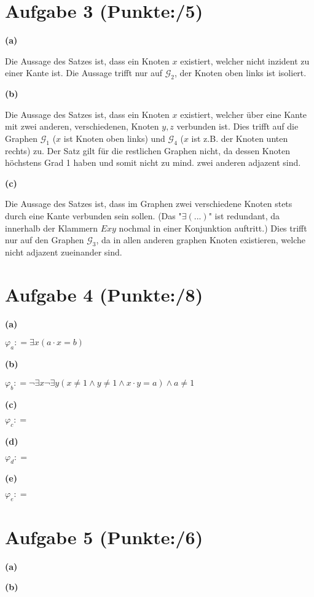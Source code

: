 \documentclass[11pt, a4paper]{article}
\newcommand{\pp}{5}
\newcommand{\ppp}{8}
\newcommand{\pppp}{6}
\newcommand{\defgr}{\mathrel{\mathop:\!\!=}}
\begin{document}
\section*{Aufgabe 3 (Punkte:\qquad/\pp)}
\textbf{(a)}
\begin{adjustwidth}{20pt}{20pt}
	Die Aussage des Satzes ist, dass ein Knoten $x$ existiert, welcher nicht inzident zu einer Kante ist. Die Aussage trifft nur auf $\mathcal{G}_2$, der Knoten oben links ist isoliert.
\end{adjustwidth}
\textbf{(b)}
\begin{adjustwidth}{20pt}{20pt}
	Die Aussage des Satzes ist, dass ein Knoten $x$ existiert, welcher über eine Kante mit zwei anderen, verschiedenen, Knoten $y,z$ verbunden ist. Dies trifft auf die Graphen
	 $\mathcal{G}_1$ ($x$ ist Knoten oben links) und  $\mathcal{G}_4$ ($x$ ist z.B. der Knoten unten rechts) zu. Der Satz gilt für die restlichen Graphen nicht, da dessen Knoten
	höchstens Grad 1 haben und somit nicht zu mind. zwei anderen adjazent sind.
\end{adjustwidth}
\textbf{(c)}
\begin{adjustwidth}{20pt}{20pt}
	Die Aussage des Satzes ist, dass im Graphen zwei verschiedene Knoten stets durch eine Kante verbunden sein sollen. (Das "$\exists(...)$" ist redundant, da innerhalb der Klammern
	$Exy$ nochmal in einer Konjunktion auftritt.) Dies trifft nur auf den Graphen  $\mathcal{G}_3$, da in allen anderen graphen Knoten existieren, welche nicht adjazent zueinander sind.
\end{adjustwidth}



\section*{Aufgabe 4 (Punkte:\qquad/\ppp)}
\textbf{(a)}
\begin{adjustwidth}{20pt}{20pt}
	$\varphi_a \defgr \exists x(a \cdot x = b)$
\end{adjustwidth}
\textbf{(b)}
\begin{adjustwidth}{20pt}{20pt}
	$\varphi_b \defgr \neg\exists x \neg\exists y(x \neq 1 \wedge y \neq 1 \wedge x \cdot y = a) \wedge a \neq 1$
\end{adjustwidth}
\textbf{(c)}
\begin{adjustwidth}{20pt}{20pt}
	$\varphi_c \defgr $
\end{adjustwidth}
\textbf{(d)}
\begin{adjustwidth}{20pt}{20pt}
	$\varphi_d \defgr $
\end{adjustwidth}
\textbf{(e)}
\begin{adjustwidth}{20pt}{20pt}
	$\varphi_e \defgr $
\end{adjustwidth}



\section*{Aufgabe 5 (Punkte:\qquad/\pppp)}
\textbf{(a)}
\begin{adjustwidth}{20pt}{20pt}
	
\end{adjustwidth}
\textbf{(b)}
\begin{adjustwidth}{20pt}{20pt}
	
\end{adjustwidth}
\end{document}
